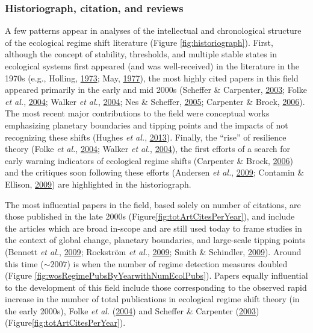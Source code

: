 \documentclass[12pt,twoside,openany]{reedthesis}
\begin{document}
\hypertarget{historiograph-citation-and-reviews}{%
\subsubsection{Historiograph, citation, and reviews}\label{historiograph-citation-and-reviews}}

A few patterns appear in analyses of the intellectual and chronological structure of the ecological regime shift literature (Figure \ref{fig:historiograph}). First, although the concept of stability, thresholds, and multiple stable states in ecological systems first appeared (and was well-received) in the literature in the 1970s (e.g., Holling, \protect\hyperlink{ref-holling1973resilience}{1973}; May, \protect\hyperlink{ref-may1977thresholds}{1977}), the most highly cited papers in this field appeared primarily in the early and mid 2000s (Scheffer \& Carpenter, \protect\hyperlink{ref-scheffer2003catastrophic}{2003}; Folke \emph{et al.}, \protect\hyperlink{ref-folke2004regime}{2004}; Walker \emph{et al.}, \protect\hyperlink{ref-walker2004resilience}{2004}; Nes \& Scheffer, \protect\hyperlink{ref-van2005implications}{2005}; Carpenter \& Brock, \protect\hyperlink{ref-carpenter2006rising}{2006}). The most recent major contributions to the field were conceptual works emphasizing planetary boundaries and tipping points and the impacts of not recognizing these shifts (Hughes \emph{et al.}, \protect\hyperlink{ref-hughes2013multiscale}{2013}). Finally, the ``rise'' of resilience theory (Folke \emph{et al.}, \protect\hyperlink{ref-folke2004regime}{2004}; Walker \emph{et al.}, \protect\hyperlink{ref-walker2004resilience}{2004}), the first efforts of a search for early warning indicators of ecological regime shifts (Carpenter \& Brock, \protect\hyperlink{ref-carpenter2006rising}{2006}) and the critiques soon following these efforts (Andersen \emph{et al.}, \protect\hyperlink{ref-andersen_ecological_2009}{2009}; Contamin \& Ellison, \protect\hyperlink{ref-contamin_indicators_2009}{2009}) are highlighted in the historiograph.

The most influential papers in the field, based solely on number of citations, are those published in the late 2000s (Figure\ref{fig:totArtCitesPerYear}), and include the articles which are broad in-scope and are still used today to frame studies in the context of global change, planetary boundaries, and large-scale tipping points (Bennett \emph{et al.}, \protect\hyperlink{ref-bennett2009understanding}{2009}; Rockström \emph{et al.}, \protect\hyperlink{ref-rockstrom_planetary_2009}{2009}; Smith \& Schindler, \protect\hyperlink{ref-smith2009eutrophication}{2009}). Around this time (\(\sim2007\)) is when the number of regime detection measures doubled (Figure \ref{fig:wosRegimePubsByYearwithNumEcolPubs}). Papers equally influential to the development of this field include those corresponding to the observed rapid increase in the number of total publications in ecological regime shift theory (in the early 2000s), Folke \emph{et al.} (\protect\hyperlink{ref-folke2004regime}{2004}) and Scheffer \& Carpenter (\protect\hyperlink{ref-scheffer2003catastrophic}{2003}) (Figure\ref{fig:totArtCitesPerYear}).
\end{document}
